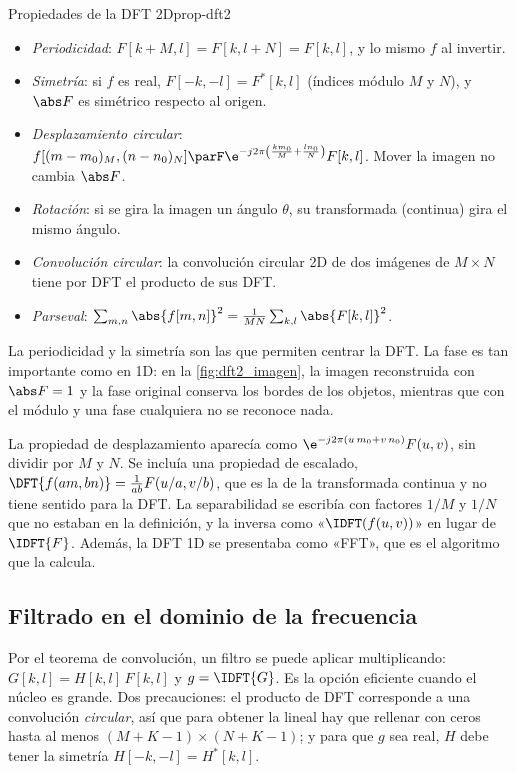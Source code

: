 \documentclass[11pt,a4paper]{scrartcl}
\begin{document}
\begin{propiedad}{Propiedades de la DFT 2D}{prop-dft2}
  \begin{itemize}
    \item \emph{Periodicidad}: $F[k+M,l]=F[k,l+N]=F[k,l]$, y lo mismo $f$ al invertir.
    \item \emph{Simetría}: si $f$ es real, $F[-k,-l]=F^*[k,l]$ (índices módulo $M$ y $N$), y $\abs F$ es simétrico respecto al origen.
    \item \emph{Desplazamiento circular}: $f[(m-m_0)_M,(n-n_0)_N]\parF\e^{-j2\pi\left(\frac{km_0}M+\frac{ln_0}N\right)}F[k,l]$. Mover la imagen no cambia $\abs F$.
    \item \emph{Rotación}: si se gira la imagen un ángulo $\theta$, su transformada (continua) gira el mismo ángulo.
    \item \emph{Convolución circular}: la convolución circular 2D de dos imágenes de $M\times N$ tiene por DFT el producto de sus DFT.
    \item \emph{Parseval}: $\sum_{m,n}\abs{f[m,n]}^2=\frac1{MN}\sum_{k,l}\abs{F[k,l]}^2$.
  \end{itemize}
\end{propiedad}

La periodicidad y la simetría son las que permiten centrar la DFT. La fase es tan importante como en 1D: en la \cref{fig:dft2_imagen}, la imagen reconstruida con $\abs F=1$ y la fase original conserva los bordes de los objetos, mientras que con el módulo y una fase cualquiera no se reconoce nada.

\begin{errata}
  La propiedad de desplazamiento aparecía como $\e^{-j2\pi(u\,m_0+v\,n_0)}F(u,v)$, sin dividir por $M$ y $N$. Se incluía una propiedad de escalado, $\DFT\{f(am,bn)\}=\frac1{ab}F(u/a,v/b)$, que es la de la transformada continua y no tiene sentido para la DFT. La separabilidad se escribía con factores $1/M$ y $1/N$ que no estaban en la definición, y la inversa como «$\IDFT(f(u,v))$» en lugar de $\IDFT\{F\}$. Además, la DFT 1D se presentaba como «FFT», que es el algoritmo que la calcula.
\end{errata}

\subsection{Filtrado en el dominio de la frecuencia}

Por el teorema de convolución, un filtro se puede aplicar multiplicando: $G[k,l]=H[k,l]\,F[k,l]$ y $g=\IDFT\{G\}$. Es la opción eficiente cuando el núcleo es grande. Dos precauciones: el producto de DFT corresponde a una convolución \emph{circular}, así que para obtener la lineal hay que rellenar con ceros hasta al menos $(M+K-1)\times(N+K-1)$; y para que $g$ sea real, $H$ debe tener la simetría $H[-k,-l]=H^*[k,l]$.
\end{document}
